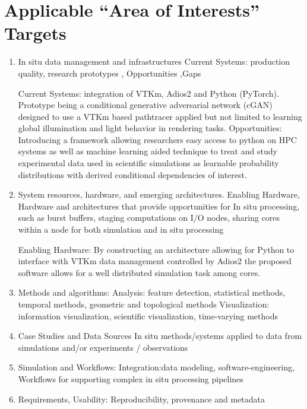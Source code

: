 \documentclass[sigconf]{acmart}%
\begin{document}
\section{Applicable ``Area of Interests'' Targets}
{\footnotesize
\begin{enumerate}
    \item In situ data management and infrastructures
Current Systems: production quality, research prototypes , Opportunities ,Gaps

Current Systems: integration of VTKm, Adios2 and Python (PyTorch). Prototype being a conditional generative adversarial network (cGAN) designed to use a VTKm based pathtracer applied but not limited to learning global illumination and light behavior in rendering tasks. 
Opportunities: Introducing a framework allowing researchers easy access to python on HPC systems as well as machine learning aided technique to treat and study experimental data used in scientific simulations as learnable probability distributions with derived conditional dependencies of interest.

   \item System resources, hardware, and emerging architectures.
Enabling Hardware, Hardware and architectures that provide opportunities for In situ processing, such as burst buffers, staging computations on I/O nodes, sharing cores within a node for both simulation and in situ processing

Enabling Hardware: By constructing an architecture allowing for Python to interface with VTKm data management controlled by Adios2 the proposed software allows for a well distributed simulation task among cores.

  \item Methods and algorithms:
Analysis: feature detection, statistical methods, temporal methods, geometric and topological methods 
Visualization: information visualization, scientific visualization, time-varying methods
  \item Case Studies and Data Sources
In situ methods/systems applied to data from simulations and/or experiments / observations
  \item Simulation and Workflows:
Integration:data modeling, software-engineering, 
Workflows for supporting complex in situ processing pipelines
  \item Requirements, Usability:
Reproducibility, provenance and metadata

\end{enumerate}
}
\end{document}
